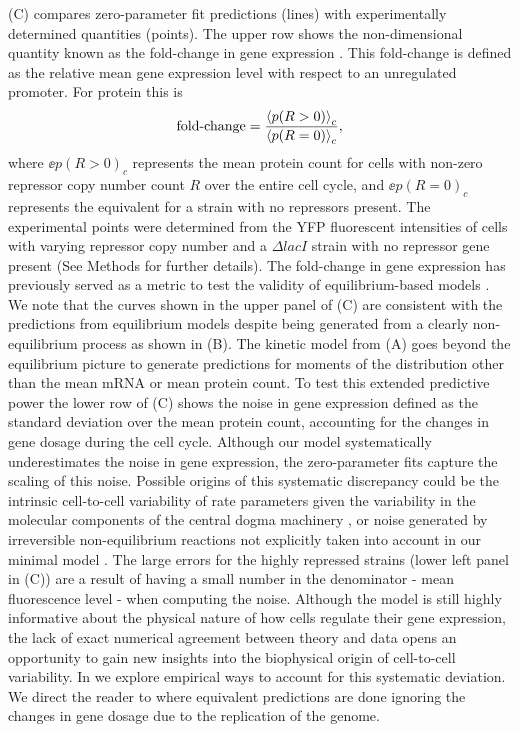 (C) compares zero-parameter fit predictions (lines) with
experimentally determined quantities (points). The upper row shows the
non-dimensional quantity known as the fold-change in gene expression
\cite{Garcia2011c}. This fold-change is defined as the relative mean gene
expression level with respect to an unregulated promoter. For protein this is
\begin{equation}
	\text{fold-change} = {\left\langle p(R > 0) \right\rangle_c \over \left\langle p(R = 0) \right\rangle_c},
\end{equation}
where $\ee{p(R > 0)}_c$ represents the mean protein count for cells with
non-zero repressor copy number count $R$ over the entire cell cycle, and
$\ee{p(R = 0)}_c$ represents the equivalent for a strain with no repressors
present. The experimental points were determined from the YFP fluorescent
intensities of cells with varying repressor copy number and a $\Delta lacI$
strain with no repressor gene present (See Methods for further details). The
fold-change in gene expression has previously served as a metric to test the
validity of equilibrium-based models \cite{Phillips2015}. We note that the
curves shown in the upper panel of (C) are consistent
with the predictions from equilibrium models \cite{Razo-Mejia2018} despite
being generated from a clearly non-equilibrium process as shown in
(B). The kinetic model from (A)
goes beyond the equilibrium picture to generate predictions for moments of the
distribution other than the mean mRNA or mean protein count. To test this
extended predictive power the lower row of (C) shows the
noise in gene expression defined as the standard deviation over the mean
protein count, accounting for the changes in gene dosage during the cell cycle.
Although our model systematically underestimates the noise in gene expression,
the zero-parameter fits capture the scaling of this noise. Possible origins of
this systematic discrepancy could be the intrinsic cell-to-cell variability of
rate parameters given the variability in the molecular components of the central
dogma machinery \cite{Jones2014a}, or noise generated by irreversible
non-equilibrium reactions not explicitly taken into account in our minimal model
\cite{Grah2020}.  The large errors for the highly repressed strains (lower left
panel in (C)) are a result of having a small number in the
denominator - mean fluorescence level - when computing the noise. Although the
model is still highly informative about the physical nature of how cells
regulate their gene expression, the lack of exact numerical agreement between
theory and data opens an opportunity to gain new insights into the biophysical
origin of cell-to-cell variability. In  we explore
empirical ways to account for this systematic deviation. We direct the reader to
 where equivalent predictions are done ignoring the
changes in gene dosage due to the replication of the genome.

